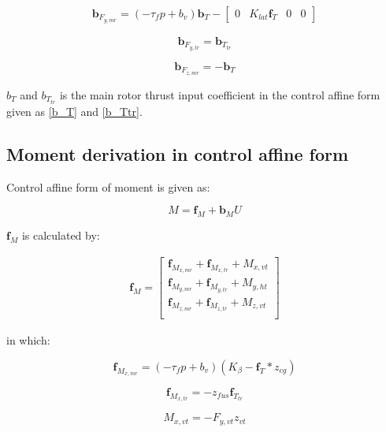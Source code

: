 \begin{gather}
	\textbf{b}_{F_{y,mr}}=(-\tau_fp+b_v)\textbf{b}_T- \begin{bmatrix}
		0&K_{lat}\textbf{f}_T&0&0
	\end{bmatrix}
\end{gather}

\begin{equation}
	\textbf{b}_{F_{y,tr}}=\textbf{b}_{T_{tr}} 
\end{equation}

\begin{equation}
	\textbf{b}_{ F_{z,mr}}=-\textbf{b}_T
\end{equation}

$b_T$ and $b_{T_{tr}}$ is the main rotor thrust input coefficient in the control affine form given as \ref{b_T} and \ref{b_Ttr}.

\subsection{Moment derivation in control affine form} \label{Moment section_affine}
Control affine form of moment is given as:

\begin{equation} \label{M}
	M=\textbf{f}_M+\textbf{b}_M U
\end{equation}

$\textbf{f}_M$ is calculated by:

\begin{gather}\label{M_0}
	\textbf{f}_M
	=
	\begin{bmatrix}
		\textbf{f}_{ M_{x,mr}}+\textbf{f}_{ M_{x,tr}}+ M_{x,vt} \\
		\textbf{f}_{ M_{y,mr}}+\textbf{f}_{ M_{y,tr}}+ M_{y,ht}\\
		\textbf{f}_{ M_{z,mr}}+\textbf{f}_{ M_{z,tr}}+ M_{z,vt} \\
	\end{bmatrix}
\end{gather}

in which:

\begin{equation}
	\textbf{f}_{ M_{x,mr}}=(-\tau_fp+b_v)(K_{\beta}-\textbf{f}_T*z_{cg})
\end{equation}

\begin{equation}
	\textbf{f}_{ M_{x,tr}}=-z_{fus}\textbf{f}_{T_{tr}}
\end{equation}

\begin{equation}
	M_{x,vt}=-F_{y,vt}z_{vt}
\end{equation}

